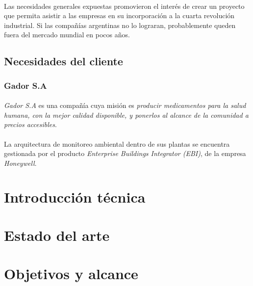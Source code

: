 		\paragraph{} Las necesidades generales expuestas promovieron el interés de crear un proyecto que permita asistir a las empresas en su incorporación a la cuarta revolución industrial. Si las compañías argentinas no lo lograran, probablemente queden fuera del mercado mundial en pocos años.

\subsection{Necesidades del cliente}
	\subsubsection{Gador S.A}
		\paragraph{} \emph{Gador S.A} es una compañía cuya misión es \emph{producir medicamentos para la salud humana, con la mejor calidad disponible, y ponerlos al alcance de la comunidad a precios accesibles}. 
		\paragraph{} La arquitectura de monitoreo ambiental dentro de sus plantas se encuentra gestionada por el producto \emph{Enterprise Buildings Integrator (EBI)}, de la empresa \emph{Honeywell}.



\section{Introducción técnica}
\label{introTecnica}

\section{Estado del arte}
\label{estadoArte}

\section{Objetivos y alcance}
\label{objetivos}
